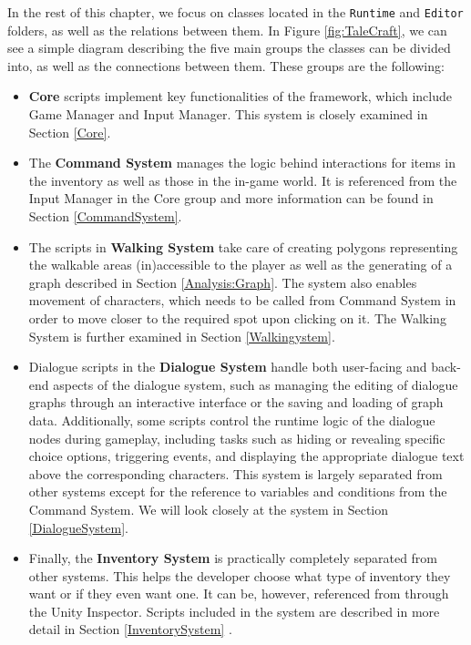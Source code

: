In the rest of this chapter, we focus on classes located in the \verb|Runtime| and \verb|Editor| folders, as well as the relations between them. In Figure \ref{fig:TaleCraft}, we can see a simple diagram describing the five main groups the classes can be divided into, as well as the connections between them. These groups are the following: 
\begin{itemize}
    \item \textbf{Core} scripts implement key functionalities of the framework, which include Game Manager and Input Manager. This system is closely examined in Section \ref{Core}.
    \item The \textbf{Command System} manages the logic behind interactions for items in the inventory as well as those in the in-game world. It is referenced from the Input Manager in the Core group and more information can be found in Section \ref{CommandSystem}.
    \item The scripts in \textbf{Walking System} take care of creating polygons representing the walkable areas (in)accessible to the player as well as the generating of a graph described in Section \ref{Analysis:Graph}. The system also enables movement of characters, which needs to be called from Command System in order to move closer to the required spot upon clicking on it. The Walking System is further examined in Section \ref{Walkingystem}.
    \item  Dialogue scripts in the \textbf{Dialogue System} handle both user-facing and back-end aspects of the dialogue system, such as managing the editing of dialogue graphs through an interactive interface or the saving and loading of graph data. Additionally, some scripts control the runtime logic of the dialogue nodes during gameplay, including tasks such as hiding or revealing specific choice options, triggering events, and displaying the appropriate dialogue text above the corresponding characters. This system is largely separated from other systems except for the reference to variables and conditions from the Command System. We will look closely at the system in Section \ref{DialogueSystem}. 
    \item Finally, the \textbf{Inventory System} is practically completely separated from other systems. This helps the developer choose what type of inventory they want or if they even want one. It can be, however, referenced from through the Unity Inspector. Scripts included in the system are described in more detail in Section \ref{InventorySystem} .
\end{itemize}

